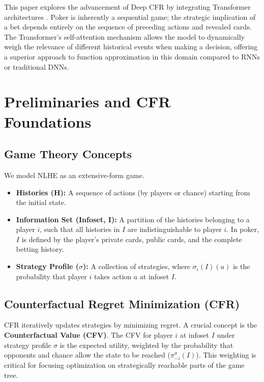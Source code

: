 \documentclass[11pt,a4paper]{article}
\begin{document}
This paper explores the advancement of Deep CFR by integrating Transformer architectures \cite{vaswani2017attention}. Poker is inherently a sequential game; the strategic implication of a bet depends entirely on the sequence of preceding actions and revealed cards. The Transformer's self-attention mechanism allows the model to dynamically weigh the relevance of different historical events when making a decision, offering a superior approach to function approximation in this domain compared to RNNs or traditional DNNs.

\section{Preliminaries and CFR Foundations}

\subsection{Game Theory Concepts}

We model NLHE as an extensive-form game.
\begin{itemize}
    \item \textbf{Histories (H):} A sequence of actions (by players or chance) starting from the initial state.
    \item \textbf{Information Set (Infoset, I):} A partition of the histories belonging to a player $i$, such that all histories in $I$ are indistinguishable to player $i$. In poker, $I$ is defined by the player's private cards, public cards, and the complete betting history.
    \item \textbf{Strategy Profile ($\sigma$):} A collection of strategies, where $\sigma_i(I)(a)$ is the probability that player $i$ takes action $a$ at infoset $I$.
\end{itemize}

\subsection{Counterfactual Regret Minimization (CFR)}

CFR iteratively updates strategies by minimizing regret. A crucial concept is the \textbf{Counterfactual Value (CFV)}. The CFV for player $i$ at infoset $I$ under strategy profile $\sigma$ is the expected utility, weighted by the probability that opponents and chance allow the state to be reached ($\pi_{-i}^\sigma(I)$). This weighting is critical for focusing optimization on strategically reachable parts of the game tree.
\end{document}
